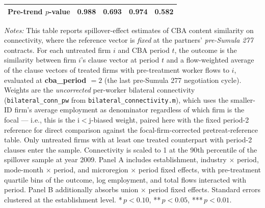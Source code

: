 \begin{table}[H]
\begin{tabular}{lcccc}
Pre-trend $p$-value & 0.988 & 0.693 & 0.974 & 0.582 \\
\hline\hline
\end{tabular}
\begin{minipage}{\linewidth}
\smallskip
\scriptsize\textit{Notes:} This table reports spillover-effect estimates of CBA content similarity on connectivity, where the reference vector is \emph{fixed} at the partners' \textit{pre-Sumula 277} contracts. For each untreated firm $i$ and CBA period $t$, the outcome is the similarity between firm $i$'s clause vector at period $t$ and a flow-weighted average of the clause vectors of treated firms with pre-treatment worker flows to $i$, evaluated at \textbf{cba\_period $= 2$} (the last pre-Sumula 277 negotiation cycle). Weights are the \emph{uncorrected} per-worker bilateral connectivity (\texttt{bilateral\_conn\_pw} from \texttt{bilateral\_connectivity.m}), which uses the smaller-ID firm's average employment as denominator regardless of which firm is the focal --- i.e., this is the i$<$j-biased weight, paired here with the fixed period-2 reference for direct comparison against the focal-firm-corrected pretreat-reference table. Only untreated firms with at least one treated counterpart with period-2 clauses enter the sample. Connectivity is scaled to 1 at the 90th percentile of the spillover sample at year 2009. Panel A includes establishment, industry $\times$ period, mode-month $\times$ period, and microregion $\times$ period fixed effects, with pre-treatment quartile bins of the outcome, log employment, and total flows interacted with period. Panel B additionally absorbs union $\times$ period fixed effects. Standard errors clustered at the establishment level. *\,$p<0.10$, **\,$p<0.05$, ***\,$p<0.01$.
\end{minipage}
\end{table}
